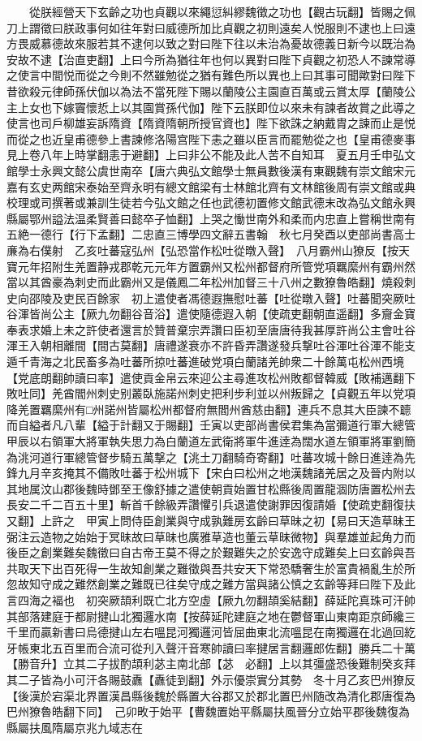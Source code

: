 　　從朕經營天下玄齡之功也貞觀以來繩愆糾繆魏徵之功也【觀古玩翻】皆賜之佩刀上謂徵曰朕政事何如往年對曰威德所加比貞觀之初則遠矣人悦服則不逮也上曰遠方畏威慕德故來服若其不逮何以致之對曰陛下往以未治為憂故德義日新今以既治為安故不逮【治直吏翻】上曰今所為猶往年也何以異對曰陛下貞觀之初恐人不諫常導之使言中間悦而從之今則不然雖勉從之猶有難色所以異也上曰其事可聞歟對曰陛下昔欲殺元律師孫伏伽以為法不當死陛下賜以蘭陵公主園直百萬或云賞太厚【蘭陵公主上女也下嫁竇懷悊上以其園賞孫代伽】陛下云朕即位以來未有諫者故賞之此導之使言也司戶柳雄妄訴隋資【隋資隋朝所授官資也】陛下欲誅之納戴胄之諫而止是悦而從之也近皇甫德參上書諫修洛陽宫陛下恚之雖以臣言而罷勉從之也【皇甫德麥事見上卷八年上時掌翻恚于避翻】上曰非公不能及此人苦不自知耳　夏五月壬申弘文館學士永興文懿公虞世南卒【唐六典弘文館學士無員數後漢有東觀魏有崇文館宋元嘉有玄史两館宋泰始至齊永明有總文館梁有士林館北齊有文林館後周有崇文館或典校理或司撰著或兼訓生徒若今弘文館之任也武德初置修文館武德末改為弘文館永興縣屬鄂州謚法温柔賢善曰懿卒子恤翻】上哭之慟世南外和柔而内忠直上嘗稱世南有五絶一德行【行下孟翻】二忠直三博學四文辭五書翰　秋七月癸酉以吏部尚書高士亷為右僕射　乙亥吐蕃寇弘州【弘恐當作松吐從暾入聲】　八月霸州山獠反【按天寶元年招附生羌置静戎郡乾元元年方置霸州又松州都督府所管党項羈縻州有霸州然當以其酋豪為刺史而此霸州又是儀鳳二年松州加督三十八州之數獠魯皓翻】燒殺刺史向邵陵及吏民百餘家　初上遣使者馮德遐撫慰吐蕃【吐從暾入聲】吐蕃聞突厥吐谷渾皆尚公主【厥九勿翻谷音浴】遣使隨德遐入朝【使疏吏翻朝直遥翻】多齎金寶奉表求婚上未之許使者還言於贊普棄宗弄讚曰臣初至唐唐待我甚厚許尚公主會吐谷渾王入朝相離間【間古莫翻】唐禮遂衰亦不許昏弄讚遂發兵撃吐谷渾吐谷渾不能支遁千青海之北民畜多為吐蕃所掠吐蕃進破党項白蘭諸羌帥衆二十餘萬屯松州西境【党底朗翻帥讀曰率】遣使貢金帛云來迎公主尋進攻松州敗都督韓威【敗補邁翻下敗吐同】羌酋閻州刺史别叢臥施諾州刺史把利步利並以州叛歸之【貞觀五年以党項降羌置羈縻州有□州諾州皆屬松州都督府無閻州酋慈由翻】連兵不息其大臣諫不聼而自縊者凡八輩【縊于計翻又于賜翻】壬寅以吏部尚書侯君集為當彌道行軍大總管甲辰以右領軍大將軍執失思力為白蘭道左武衛將軍牛進逹為闊水道左領軍將軍劉簡為洮河道行軍總管督步騎五萬撃之【洮土刀翻騎奇寄翻】吐蕃攻城十餘日進逹為先鋒九月辛亥掩其不備敗吐蕃于松州城下【宋白曰松州之地漢魏諸羌居之及晉内附以其地属汶山郡後魏時鄧至王像舒據之遣使朝貢始置甘松縣後周置龍涸防唐置松州去長安二千二百五十里】斬首千餘級弄讚懼引兵退遣使謝罪因復請婚【使疏吏翻復扶又翻】上許之　甲寅上問侍臣創業與守成孰難房玄齡曰草昧之初【易曰天造草昧王弼注云造物之始始于冥昧故曰草昧也廣雅草造也董云草昧微物】與羣雄並起角力而後臣之創業難矣魏徵曰自古帝王莫不得之於艱難失之於安逸守成難矣上曰玄齡與吾共取天下出百死得一生故知創業之難徵與吾共安天下常恐驕奢生於富貴禍亂生於所忽故知守成之難然創業之難既已往矣守成之難方當與諸公慎之玄齡等拜曰陛下及此言四海之褔也　初突厥頡利既亡北方空虛【厥九勿翻頡奚結翻】薛延陀真珠可汗帥其部落建庭于都尉揵山北獨邏水南【按薛延陀建庭之地在鬱督軍山東南距京師纔三千里而贏新書曰烏德揵山左右嗢昆河獨邏河皆屈曲東北流嗢昆在南獨邏在北過回紇牙帳東北五百里而合流可從刋入聲汗音寒帥讀曰率揵居言翻邏郎佐翻】勝兵二十萬【勝音升】立其二子拔酌頡利苾主南北部【苾　必翻】上以其彊盛恐後難制癸亥拜其二子皆為小可汗各賜鼓纛【纛徒到翻】外示優崇實分其勢　冬十月乙亥巴州獠反【後漢於宕渠北界置漢昌縣後魏於縣置大谷郡又於郡北置巴州随改為清化郡唐復為巴州獠魯皓翻下同】　己卯畋于始平【曹魏置始平縣屬扶風晉分立始平郡後魏復為縣屬扶風隋屬京兆九域志在